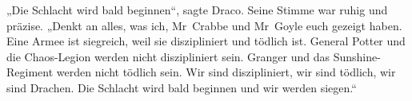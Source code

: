 „Die Schlacht wird bald beginnen“, sagte Draco. Seine Stimme war ruhig und präzise. „Denkt an alles, was ich, Mr~Crabbe und Mr~Goyle euch gezeigt haben. Eine Armee ist siegreich, weil sie diszipliniert und tödlich ist. General Potter und die Chaos-Legion werden nicht diszipliniert sein. Granger und das Sunshine-Regiment werden nicht tödlich sein. Wir sind diszipliniert, wir sind tödlich, wir sind Drachen. Die Schlacht wird bald beginnen und wir werden siegen.“


